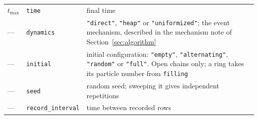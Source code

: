 \documentclass[11pt]{article}
\begin{document}
\begin{center}
\begin{tabular}{llp{7.4cm}}
$t_{\max}$ & \texttt{time} & final time \\
--- & \texttt{dynamics} & \texttt{"direct"}, \texttt{"heap"} or
    \texttt{"uniformized"}; the event mechanism, described in the
    mechanism note of Section~\ref{sec:algorithm} \\
--- & \texttt{initial} & initial configuration: \texttt{"empty"},
    \texttt{"alternating"}, \texttt{"random"} or \texttt{"full"}. Open chains
    only; a ring takes its particle number from \texttt{filling} \\
--- & \texttt{seed} & random seed; sweeping it gives independent repetitions \\
--- & \texttt{record\_interval} & time between recorded rows \\
\hline
\end{tabular}
\end{center}



\end{document}
